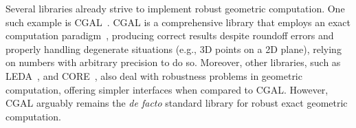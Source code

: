Several libraries already strive to implement robust geometric computation.  One
such example is \ac{CGAL}~\cite{CGAL:5.3:Project}.  \Ac{CGAL} is a comprehensive
library that employs an exact computation paradigm~\cite{Yap:1995:ECP},
producing correct results despite roundoff errors and properly handling
degenerate situations (e.g., 3D points on a 2D plane), relying on numbers with
arbitrary precision to do so.  Moreover, other libraries, such as
\ac{LEDA}~\cite{Mehlhorn:1989:LEDA}, and
CORE~\cite{Karamcheti:1999:CLRNGC,Yu:2010:CORE2}, also deal with robustness
problems in geometric computation, offering simpler interfaces when compared to
\ac{CGAL}.  However, \ac{CGAL} arguably remains the \textit{de facto} standard
library for robust exact geometric computation.
